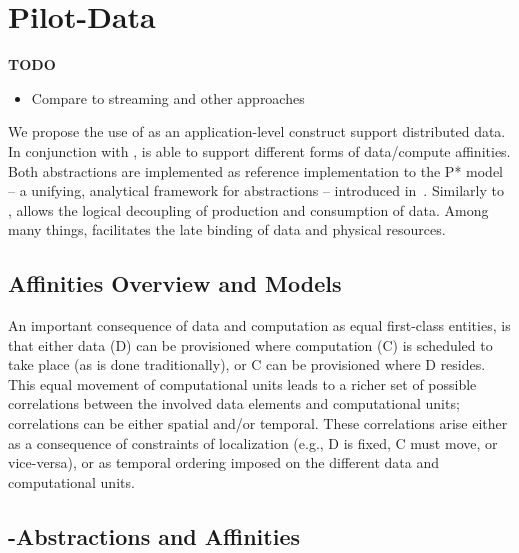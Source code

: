 \documentclass[conference]{IEEEtran}
\begin{document}
\section{Pilot-Data}

\textbf{TODO}
\begin{itemize}
\item Compare to streaming and other approaches
\end{itemize}
	
We propose the use of \pilotdata as an application-level construct support
distributed data. In conjunction with \pilotjob, \pilotdata is able to support
different forms of data/compute affinities. Both abstractions are implemented
as reference implementation to the P* model -- a unifying, analytical
framework for \pilot abstractions -- introduced in~\cite{pstar11}. 
Similarly to \pilotjobs, \pilotdata allows the logical decoupling
of production and consumption of data. Among many things, \pilotdata 
facilitates the late binding of data and physical resources.  

\subsection{Affinities Overview and Models}




An important consequence of data and computation as equal first-class
entities, is that either data (D) can be provisioned where computation
(C) is scheduled to take place (as is done traditionally), or C can be
provisioned where D resides. This equal movement of computational
units leads to a richer set of possible correlations between the
involved data elements and computational units; correlations can be
either spatial and/or temporal. These correlations arise either as a
consequence of constraints of localization (e.g., D is fixed, C must
move, or vice-versa), or as temporal ordering imposed on the different
data and computational units.


\subsection{\pilot-Abstractions and Affinities}
\end{document}
